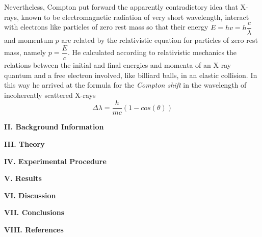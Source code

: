 \documentclass[fleqn]{article}
\begin{document}
  Nevertheless, Compton put forward the apparently contradictory idea that X-rays, known to be electromagnetic radiation of very short wavelength,
  interact with electrons like particles of zero rest mass so that their energy $E=hv=h \dfrac{c}{\lambda}$ and momentum $p$ are related by the
  relativistic equation for particles of zero rest mass, namely $p=\dfrac{E}{c}$. He calculated according to relativistic mechanics the relations between the initial
  and final energies and momenta of an X-ray quantum and a free electron involved, like billiard balls, in an elastic collision. In this way he arrived at the formula for 
  the \emph{Compton shift} in the wavelength of incoherently scattered X-rays
  $$\Delta \lambda=\dfrac{h}{mc} \left(1-cos(\theta)\right)$$


  \bigbreak

  \textbf{II. Background Information}

  \textbf{III. Theory}

  \textbf{IV. Experimental Procedure}

  \textbf{V. Results}

  \textbf{VI. Discussion}

  \textbf{VII. Conclusions}

  \textbf{VIII. References}
\end{document}
